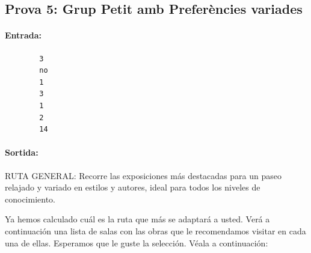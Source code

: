 \documentclass[a4paper]{article}
\begin{document}
	
	\subsection{Prova 5: Grup Petit amb Preferències variades}
	\paragraph{Entrada:}
	\begin{verbatim}
		3
		no
		1
		3
		1
		2
		14
	\end{verbatim}


	\paragraph{Sortida:\\}
		
		RUTA GENERAL: Recorre las exposiciones más destacadas para un paseo relajado y variado en estilos y autores, ideal para todos los niveles de conocimiento.
		
		Ya hemos calculado cuál es la ruta que más se adaptará a usted. Verá a continuación una lista de salas con las obras que le recomendamos visitar en cada una de ellas. Esperamos que le guste la selección. Véala a continuación:
		
\end{document}
